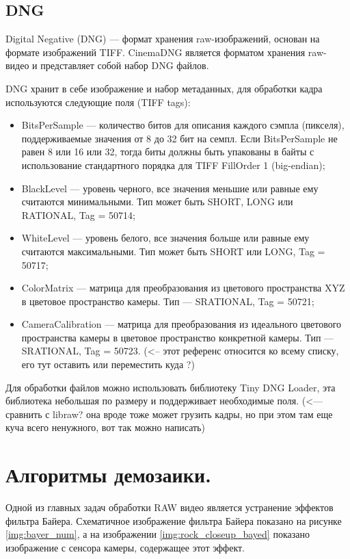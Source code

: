 \subsection{DNG}

Digital Negative (DNG) --- формат хранения raw-изображений, основан на формате изображений TIFF. CinemaDNG является форматом хранения raw-видео и представляет собой набор DNG файлов. 

DNG хранит в себе изображение и набор метаданных, для обработки кадра используются следующие поля (TIFF tags):
\begin{itemize}
	\item BitsPerSample --- количество битов для описания каждого сэмпла (пикселя), поддерживаемые значения от 8 до 32 бит на семпл. Если BitsPerSample не равен 8 или 16 или 32, тогда биты должны быть упакованы в байты с использование стандартного порядка для TIFF FillOrder 1 (big-endian);
	\item BlackLevel --- уровень черного, все значения меньшие или равные ему считаются минимальными. Тип может быть SHORT, LONG или RATIONAL, Tag = 50714;
	\item WhiteLevel --- уровень белого, все значения больше или равные ему считаются максимальными. Тип может быть SHORT или LONG, Tag = 50717;
	\item ColorMatrix --- матрица для преобразования из цветового пространства XYZ в цветовое пространство камеры. Тип --- SRATIONAL, Tag = 50721;
	\item CameraCalibration --- матрица для преобразования из идеального цветового пространства камеры в цветовое пространство конкретной камеры. Тип --- SRATIONAL, Tag = 50723. \cite{dngspec} (<-- этот референс относится ко всему списку, его тут оставить или переместить куда ?)
\end{itemize}

Для обработки файлов можно использовать библиотеку \guillemotleft Tiny DNG Loader\guillemotright, эта библиотека небольшая по размеру и поддерживает необходимые поля. (<--- сравнить с libraw? она вроде тоже может грузить кадры, но при этом там еще куча всего ненужного, вот так можно написать)
\section{Алгоритмы демозаики.}

Одной из главных задач обработки RAW видео является устранение эффектов фильтра Байера. Схематичное изображение фильтра Байера показано на рисунке \ref{img:bayer_num}, а на изображении \ref{img:rock_closeup_bayed} показано изображение с сенсора камеры, содержащее этот эффект.

